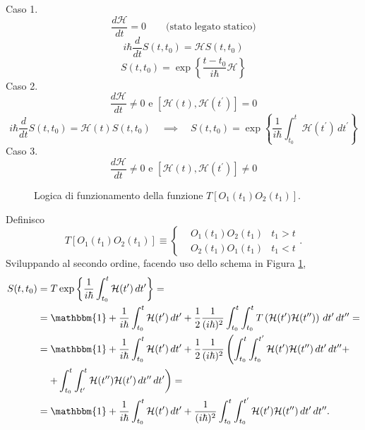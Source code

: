 \bigskip
\noindent
Caso 1.
\[
\frac{d\mathcal{H}}{dt} = 0 \qquad \text{(stato legato statico)}
\]
\[
i \hbar \frac{d}{dt} S(t, t_0) = \mathcal{H} S(t, t_0)
\]
\[
\boxed{S(t, t_0) = \exp \left\{ \frac{t - t_0}{i \hbar}\mathcal{H} \right\} }
\]
Caso 2.
\[
\frac{d\mathcal{H}}{dt} \neq 0 \text{ e } [\mathcal{H}(t), \mathcal{H}(t^\prime)] = 0
\]
\[
i \hbar \frac{d}{dt} S(t, t_0) = \mathcal{H}(t) S(t, t_0) \quad \implies \quad \boxed{S(t, t_0) = \exp{\left\{ \frac{1}{i \hbar} \int_{t_0}^{t} \mathcal{H}(t^\prime) \, dt^\prime \right\}}}
\]
Caso 3.
\[
\frac{d\mathcal{H}}{dt} \neq 0 \text{ e } [\mathcal{H}(t), \mathcal{H}(t^\prime)] \neq 0
\]
\begin{figure}
\centering
{}
\caption{Logica di funzionamento della funzione \(T[O_1(t_1)O_2(t_1)]\).}
\label{schema_T}
\end{figure}
Definisco
\[
T \left[ O_1(t_1) O_2(t_1) \right] \equiv \left\{
\begin{aligned} 
    & O_1(t_1) O_2(t_1) & t_1 > t \\ 
    & O_2(t_1) O_1(t_1) & t_1 < t
\end{aligned} \right. .
\]
Sviluppando al secondo ordine, facendo uso dello schema in Figura \ref{schema_T},
\begin{align*}
S(t, t_0) &= T \exp{\left\{ \frac{1}{i \hbar} \int_{t_0}^t \mathcal{H}(t^\prime) \, dt^\prime \right\}} = \\
&= \mathbbm{1} + \frac{1}{i \hbar} \int_{t_0}^t \mathcal{H}(t^\prime) \, dt^\prime + \frac{1}{2} \frac{1}{(i \hbar)^2} \int_{t_0}^t \int_{t_0}^t T \left( \mathcal{H}(t^\prime) \mathcal{H}(t'') \right) \, dt' \, dt'' = \\
&= \mathbbm{1} + \frac{1}{i \hbar} \int_{t_0}^t \mathcal{H}(t^\prime) \, dt^\prime + \frac{1}{2} \frac{1}{(i \hbar)^2} \left( \int_{t_0}^t \int_{t_0}^{t'} \mathcal{H}(t') \mathcal{H}(t'') \, dt' \, dt'' + \right. \\
& \left. \quad + \int_{t_0}^t \int_{t'}^t \mathcal{H}(t'') \mathcal{H}(t') \, dt'' \, dt' \right) = \\
&= \mathbbm{1} + \frac{1}{i \hbar} \int_{t_0}^t \mathcal{H}(t^\prime) \, dt^\prime + \frac{1}{(i \hbar)^2} \int_{t_0}^t \int_{t_0}^{t'} \mathcal{H}(t') \mathcal{H}(t'') \, dt' \, dt''.
\end{align*}
